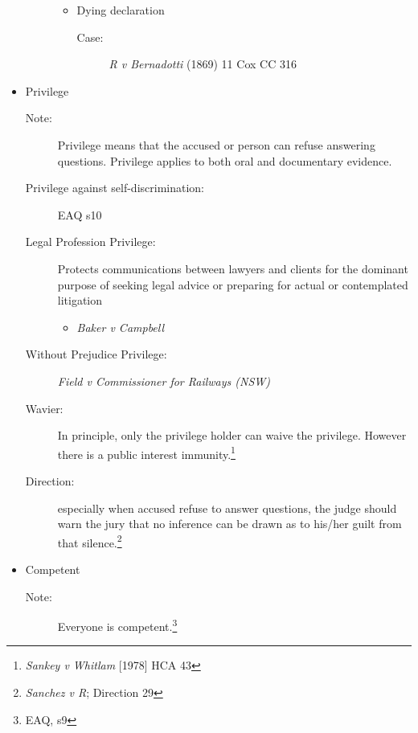\begin{itemize}
\begin{description}
\begin{itemize}
                    \item Dying declaration
                        \begin{description}
                            \item[Case:] \textit{R v Bernadotti} (1869) 11 Cox CC 316 
                        \end{description}
                \end{itemize}
        \end{description}
    \item Privilege
        \begin{description}
            \item[Note:] Privilege means that the accused or person can refuse answering questions. Privilege applies to both oral and documentary evidence. 
            \item[Privilege against self-discrimination:]EAQ s10 
            \item[Legal Profession Privilege:]Protects communications between lawyers and clients for the dominant purpose of seeking legal advice or preparing for actual or contemplated litigation
                \begin{itemize}
                    \item \textit{Baker v Campbell}
                \end{itemize}
            \item[Without Prejudice Privilege:]\textit{Field v Commissioner for Railways (NSW)}
            \item[Wavier:] In principle, only the privilege holder can waive the privilege. However there is a public interest immunity.\footnote{\textit{Sankey v Whitlam} [1978] HCA 43}
            \item[Direction:]especially when accused refuse to answer questions, the judge should warn the jury that no inference can be drawn as to his/her guilt from that silence.\footnote{\textit{Sanchez v R}; Direction 29}
        \end{description}
    \item Competent
        \begin{description}
            \item[Note:] Everyone is competent.\footnote{EAQ, s9}
        \end{description}


\end{itemize}
